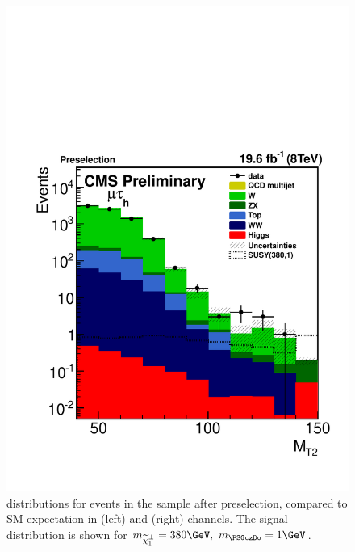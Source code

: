 \begin{figure}[!htb]
\includegraphics[angle=0,scale=0.375]{SelectionMuTau/MT2_mutau.pdf}
\caption{\mttwo  distributions for events in the sample after preselection, compared to SM expectation in (left) \eTau and (right) \muTau channels. The signal distribution is shown for $m_{\chione}=380\GeV,~m_{\PSGczDo}=1\GeV$.}
\label{fig:mt2leptontau}
\end{figure}

